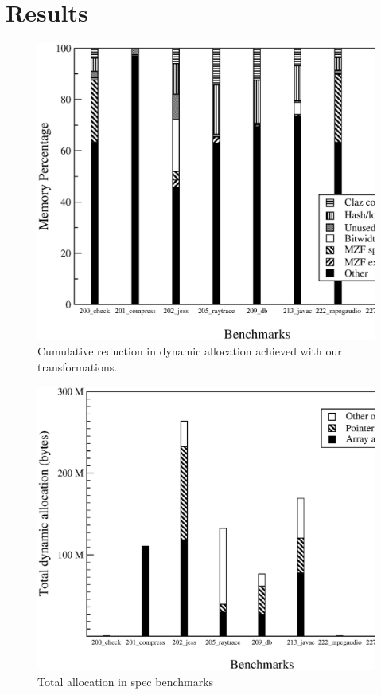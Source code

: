 \documentclass[preprint]{acmconf}
\begin{document}
\section{Results}
\begin{figure}
\includegraphics[scale=0.32,clip=true]{Figures/spaceopt.eps}
\caption{Cumulative reduction in dynamic allocation achieved with
  our transformations.}
\label{fig:total}
\end{figure}
\begin{figure}
\includegraphics[scale=0.32,clip=true]{Figures/spec-space.eps}
\caption{Total allocation in spec benchmarks}
\label{fig:space}
\end{figure}
\end{document}
